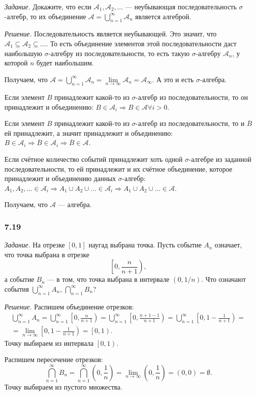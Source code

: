 \textit{Задание.}
Докажите, что если $ \mathcal{A}_1, \mathcal{A}_2, \dotsc $ ---
неубывающая последовательность $ \sigma $-алгебр, то их объединение $ \mathcal{A} = \bigcup \limits_{n=1}^{ \infty } \mathcal{A}_n$ является алгеброй.

\textit{Решение.} Последовательность является неубывающей.
Это значит, что $ \mathcal{A}_1 \subseteq \mathcal{A}_2 \subseteq \dotsc $.
То есть объединение элементов этой последовательности даст наибольшую $ \sigma $-алгебру из последовательности, то есть такую $ \sigma $-алгебру $ \mathcal{A}_n$, у которой $n$ будет наибольшим.

Получаем,
что
$ \mathcal{A} =
\bigcup \limits_{n=1}^{ \infty } \mathcal{A}_n =
\lim \limits_{n \rightarrow \infty } \mathcal{A}_n =
\mathcal{A}_{ \infty}$.
А это и есть $ \sigma $-алгебра.

Если элемент $B$ принадлежит какой-то из $ \sigma $-алгебр из последовательности,
то он принадлежит и объединению: $B \in \mathcal{A}_i \Rightarrow B \in \mathcal{A} \forall i > 0$.

Если элемент $B$ принадлежит какой-то из $ \sigma $-алгебр из последовательности,
то и $ \overline{B} $ ей принадлежит, а значит принадлежит и объединению:
$B \in \mathcal{A}_i \Rightarrow
\overline{B} \in \mathcal{A}_i \Rightarrow
\overline{B} \in \mathcal{A} $.

Если счётное количество событий принадлежит хоть одной $ \sigma $-алгебре из заданной последовательности,
то ей принадлежит и их счётное объединение, которое принадлежит и объединению данных $ \sigma $-алгебр:
$A_1, A_2, \dotsc \in \mathcal{A}_i \Rightarrow
A_1 \cup A_2 \cup \dotsc \in \mathcal{A}_i \Rightarrow
A_1 \cup A_2 \cup \dotsc \in \mathcal{A} $.

Получаем, что $ \mathcal{A} $ --- алгебра.

\subsubsection*{7.19}

\textit{Задание.} На отрезке $ \left[ 0, 1 \right] $ наугад выбрана точка.
Пусть событие $A_n$ означает, что точка выбрана в отрезке
$$ \left[ 0, \frac{n}{n+1} \right),$$
а событие $B_n$ --- в том, что точка выбрана в интервале $ \left( 0, 1/n \right) $.
Что означают события $ \bigcup \limits_{n=1}^{ \infty } A_n, \, \bigcap \limits_{n=1}^{ \infty } B_n$?

\textit{Решение.} Распишем объединение отрезков:
\begin{equation*}
\begin{split}
\bigcup \limits_{n=1}^{ \infty } A_n =
\bigcup \limits_{n=1}^{ \infty } \left[ 0, \frac{n}{n+1} \right) =
\bigcup \limits_{n=1}^{ \infty } \left[ 0, \frac{n+1-1}{n+1} \right) =
\bigcup \limits_{n=1}^{ \infty } \left[ 0, 1 - \frac{1}{n+1} \right) = \\
= \lim \limits_{n \rightarrow \infty } \left[ 0, 1 - \frac{1}{n+1} \right) =
\left[ 0, 1 \right).
\end{split}
\end{equation*}
Точку выбираем из интервала $ \left[ 0, 1 \right) $.

Распишем пересечение отрезков:
$$ \bigcap \limits_{n=1}^{ \infty } B_n =
\bigcap \limits_{n=1}^{ \infty } \left( 0, \frac{1}{n} \right) =
\lim \limits_{n \rightarrow \infty } \left( 0, \frac{1}{n} \right) =
\left( 0, 0 \right) =
\emptyset.$$
Точку выбираем из пустого множества.
